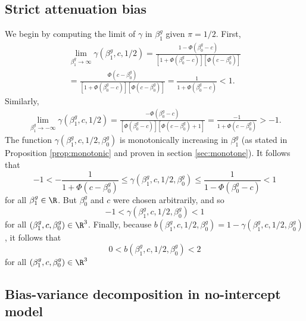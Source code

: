 \documentclass[12pt]{article}
\begin{document}
\begin{appendices}
\subsection{Strict attenuation bias}\label{sec:att_bias}

We begin by computing the limit of $\gamma$ in $\beta^g_1$ given $\pi = 1/2$.  First,
\begin{multline*}
\lim_{\beta^g_1 \to \infty} \gamma(\beta^g_1, c, 1/2) = \frac{1 - \Phi(\beta^g_0 - c)}{\left[1 + \Phi(\beta^g_0 - c) \right] \left[\Phi(c - \beta^g_0) \right]} \\ = \frac{\Phi(c - \beta^g_0)}{ \left[1 + \Phi(\beta^g_0 - c) \right] \left[\Phi(c - \beta^g_0) \right]} = \frac{1}{1 + \Phi(\beta^g_0 - c)} < 1.
\end{multline*}
Similarly,
\begin{multline*}
\lim_{\beta^g_1 \to -\infty} \gamma(\beta^g_1, c, 1/2) = \frac{ - \Phi(\beta^g_0 - c)}{\left[\Phi(\beta^g_0 - c)\right] \left[\Phi(c - \beta^g_0) + 1 \right]} = \frac{-1}{1 + \Phi(c - \beta^g_0)} > -1.
\end{multline*}
The function $\gamma(\beta^g_1, c, 1/2, \beta^g_0)$ is monotonically increasing in $\beta^g_1$ (as stated in Proposition \ref{prop:monotonic} and proven in section \ref{sec:monotone}). It follows that 
$$-1 < -\frac{1}{1 + \Phi(c - \beta^g_0)} \leq \gamma(\beta^g_1, c, 1/2, \beta^g_0) \leq \frac{1}{1 - \Phi(\beta^g_0 - c)} < 1$$ for all $\beta^g_1 \in \R$. But $\beta^g_0$ and $c$ were chosen arbitrarily, and so
$$-1 < \gamma(\beta^g_1, c, 1/2, \beta^g_0) < 1$$ for all $(\beta^g_1, c, \beta^g_0) \in \R^3$. Finally, because $b(\beta^g_1, c, 1/2, \beta^g_0) = 1 - \gamma(\beta^g_1, c, 1/2, \beta^g_0)$, it follows that
$$ 0 < b(\beta^g_1, c, 1/2, \beta^g_0) < 2$$ for all $(\beta^g_1, c, \beta^g_0) \in \R^3$

\subsection{Bias-variance decomposition in no-intercept model}\label{sec:bv_decomp}
 

\end{appendices}
\end{document}
